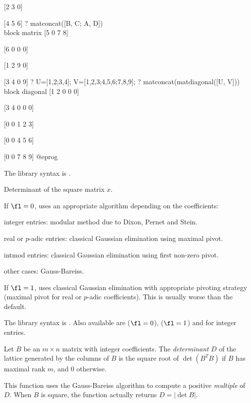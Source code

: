 [2 3 0]

[4 5 6]
? matconcat([B, C; A, D]) \\ block matrix
[5 0 7 8]

[6 0 0 0]

[1 2 9 0]

[3 4 0 9]
? U=[1,2;3,4]; V=[1,2,3;4,5,6;7,8,9];
? matconcat(matdiagonal([U, V])) \\ block diagonal
[1 2 0 0 0]

[3 4 0 0 0]

[0 0 1 2 3]

[0 0 4 5 6]

[0 0 7 8 9]
@eprog

The library syntax is .

\label{se:matdet}
Determinant of the square matrix $x$.

If $\fl=0$, uses an appropriate algorithm depending on the coefficients:

\item integer entries: modular method due to Dixon, Pernet and Stein.

\item real or $p$-adic entries: classical Gaussian elimination using maximal
pivot.

\item intmod entries: classical Gaussian elimination using first non-zero
pivot.

\item other cases: Gauss-Bareiss.

If $\fl=1$, uses classical Gaussian elimination with appropriate pivoting
strategy (maximal pivot for real or $p$-adic coefficients). This is usually
worse than the default.

The library syntax is .
Also available are  ($\fl=0$),
 ($\fl=1$) and  for integer
entries.

\label{se:matdetint}
Let $B$ be an $m\times n$ matrix with integer coefficients. The
\emph{determinant} $D$ of the lattice generated by the columns of $B$ is
the square root of $\det(B^T B)$ if $B$ has maximal rank $m$, and $0$
otherwise.

This function uses the Gauss-Bareiss algorithm to compute a positive
\emph{multiple} of $D$. When $B$ is square, the function actually returns
$D = |\det B|$.

